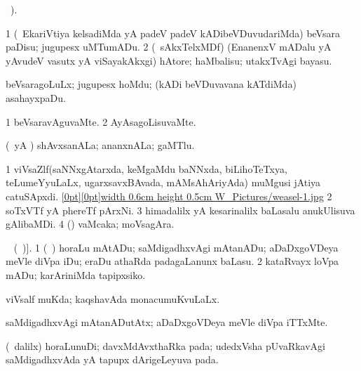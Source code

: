 {\bentry
{} 
\gl{\kirx}
 \BUkaq\ ).\bmng
\emng

\noindent 
\gl{\sakirx}
\expl{}
\bmng
\bnum
\num{1} (\kanmu\ EkariVtiya kelsadiMda yA padeV padeV kADibeVDuvudariMda) beVsara paDisu; jugupesx uMTumADu. 
\num{2} (\kanmu\ sAkxTelxMDf) (EnanenxV mADalu yA yAvudeV vasutx yA viSayakAkxgi) hAtore; haMbalisu; utakxTvAgi bayasu. 
\enum
\emng

\noindent 
\gl{\akirx}
\expl{}
\bmng
beVsaragoLuLx; jugupesx hoMdu; (kADi beVDuvavana kATdiMda) asahayxpaDu. 
\emng
\eentry

\bentry 
{} 
\gl{\kirxvi}
\expl{}
\bmng
\bnum
\num{1} beVsaravAguvaMte. 
\num{2} AyAsagoLisuvaMte. 
\enum
\emng
\eentry

\bentry
{} 
\gl{\nA}
\expl{}
\bmng
(\pArxparx\ yA \pArxM) shAvxsanALa; ananxnALa; gaMTlu. 
\emng
\eentry

\bentry
{} 
\gl{\nA}
\expl{}
\bmng
\bnum
\num{1} viVsaZlf(saNNxgAtarxda, keMgaMdu baNNxda, biLihoTeTxya, teLumeYyuLaLx, ugarxsavxBAvada, mAMsAhAriyAda) muMgusi jAtiya catuSApxdi. \quad \hyperlink{weasel-1figure}{\raisebox{-0.15cm}[0pt][0pt]{\pdfimage width 0.6cm height 0.5cm {W_Pictures/weasel-1.jpg}}} 
\num{2} soTxVTf  yA phereTf pArxNi. 
\num{3} himadalilx yA kesarinalilx baLasalu anukUlisuva gAlibaMDi. 
\num{4} (\AmA) vaMcaka; moVsagAra. 
\enum
\emng
\eentry

\bentry
{} 
\gl{\akirx}
\expl{[\BU\ matutx \BUkaq\ \eng{weaselled} (\ame\ \eng{weaseled});}
\vakaq\  (\ame\ )].  \bmng
\bnum
\num{1} (\kanmu\ \ame) horaLu mAtADu; saMdigadhxvAgi mAtanADu; aDaDxgoVDeya meVle diVpa iDu; eraDu athaRda padagaLanunx baLasu. 
\num{2} kataRvayx loVpa mADu; karAriniMda tapipxsiko. 
\enum
\emng
\eentry

\bentry
{} 
\gl{\gu}
\expl{}
\bmng
viVsalf muKda; kaqshavAda monacumuKvuLaLx. 
\emng
\eentry

\bentry
{} 
\gl{\kirxvi}
\expl{}
\bmng
saMdigadhxvAgi mAtanADutAtx; aDaDxgoVDeya meVle diVpa iTTxMte. 
\emng
\eentry

\bentry
{} 
\gl{\nA}
\expl{}
\bmng
(\sA\ \bava dalilx) horaLunuDi; davxMdAvxthaRka pada; udedxVsha pUvaRkavAgi saMdigadhxvAda yA tapupx dArigeLeyuva pada. 
\emng
\eentry

}
